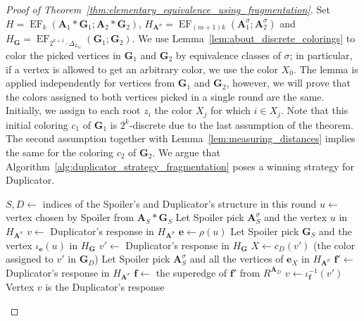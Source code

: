 \documentclass[11pt]{article}
\theoremstyle{plain}
\theoremstyle{definition}
\theoremstyle{remark}
\DeclareMathOperator{\EF}{EF}
\newcommand{\str}[1]{\mathbf{#1}}
\newcommand{\maxarity}[1]{\Delta_{#1}}
\newcommand{\tpl}[1]{{\bm{#1}}}
\begin{document}
\begin{proof}[Proof of Theorem~\ref{thm:elementary_equivalence_using_fragmentation}]
    Set $H = \EF_k(\str{A}_1*\str{G}_1; \str{A}_2*\str{G}_2)$, $H_{\str{A}^\sigma} = \EF_{(m+1)k}(\str{A}^\sigma_1;\str{A}^\sigma_2)$ and $H_\str{G} = \EF_{2^{k+1}\cdot\maxarity{L_G}}(\str{G}_1;\str{G}_2)$.
    We use Lemma~\ref{lem:about_discrete_colorings} to color the picked vertices in $\str{G}_1$ and $\str{G}_2$ by equivalence classes of $\sigma$; in particular, if a vertex is allowed to get an arbitrary color, we use the color $X_0$.
    The lemma is applied independently for vertices from $\str{G}_1$ and $\str{G}_2$, however, we will prove that the colors assigned to both vertices picked in a single round are the same.  
    Initially, we assign to each root $z_i$ the color $X_j$ for which $i \in X_j$.
    Note that this initial coloring $c_1$ of $\str{G}_1$ is $2^k$-discrete due to the last assumption of the theorem.
    The second assumption together with Lemma~\ref{lem:measuring_distances} implies the same for the coloring $c_2$ of $\str{G}_2$.
    We argue that Algorithm~\ref{alg:duplicator_strategy_fragmentation} poses a winning strategy for Duplicator.
    
\begin{algorithm}
    \caption{Duplicator's response in one round of $H$}
    \label{alg:duplicator_strategy_fragmentation}
    \begin{algorithmic}[1]
        \State $S, D \gets$ indices of the Spoiler's and Duplicator's structure in this round
        \State $u \gets$ vertex chosen by Spoiler from $\str{A}_S * \str{G}_S$ 
            \State Let Spoiler pick $\str{A}_S^\sigma$ and the vertex $u$ in $H_{\str{A}^\sigma}$
            \State $v \gets$ Duplicator's response in $H_{\str{A}^\sigma}$
        \Else
            \State $\tpl{e} \gets \rho(u)$
            \State Let Spoiler pick $\str{G}_S$ and the vertex $\iota_\tpl{e}(u)$ in $H_\str{G}$
                \label{step:spoiler_selects_in_HG}
            \State $v' \gets$ Duplicator's response in $H_\str{G}$
                \label{step:duplicator_selects_in_HG}
            \State $X \gets c_D(v')$ (the color assigned to $v'$ in $\str{G}_D$)
            \State Let Spoiler pick $\str{A}_S^\sigma$ and all the vertices of $\tpl{e}_X$ in $H_{\str{A}^\sigma}$
            \State $\tpl{f}' \gets$ Duplicator's response in $H_{\str{A}^\sigma}$
            \State $\tpl{f} \gets$ the superedge of $\tpl{f}'$ from $R^{\str{A}_D}$
            \State $v \gets \iota_{\tpl{f}}^{-1}(v')$
        \EndIf
        \State Vertex $v$ is the Duplicator's response
    \end{algorithmic}
\end{algorithm}


\end{proof}
\end{document}
